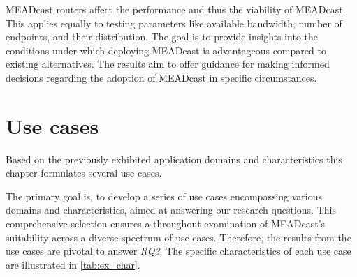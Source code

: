 \begin{enumerate}
            MEADcast routers affect the performance and thus the viability of
            MEADcast.
        This applies equally to testing parameters like available bandwidth,
            number of endpoints, and their distribution.
        The goal is to provide insights into the conditions under which
            deploying MEADcast is advantageous compared to existing
            alternatives.
        The results aim to offer guidance for making informed decisions
            regarding the adoption of MEADcast in specific circumstances.
\end{enumerate}


\section{Use cases} %
\label{sec:Use cases}





Based on the previously exhibited application domains and characteristics this
    chapter formulates several use cases.

The primary goal is, to develop a series of use cases encompassing various
    domains and characteristics, aimed at answering our research questions.
This comprehensive selection ensures a throughout examination of MEADcast's
    suitability across a diverse spectrum of use cases.
Therefore, the results from the use cases are pivotal to answer \textit{RQ3}.
The specific characteristics of each use case are illustrated in
    \autoref{tab:ex_char}.

